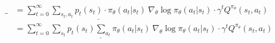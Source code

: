 \begin{align}
\_ &= \sum_{t=0}^{\infty} \underline{\sum_{s_t,a_t} p_t(s_t) \cdot \pi_\theta(a_t|s_t)} \ \nabla_\theta\log \pi_\theta(a_t|s_t)\cdot \gamma^t Q^{\pi_\theta}(s_t, a_t) \\
&= \sum_{t=0}^{\infty} \underline{\sum_{s_t} p_t(s_t) \sum_{a_t} \pi_\theta(a_t|s_t)} \ \nabla_\theta\log \pi_\theta(a_t|s_t)\cdot \gamma^t Q^{\pi_\theta}(s_t, a_t)
\end{align}